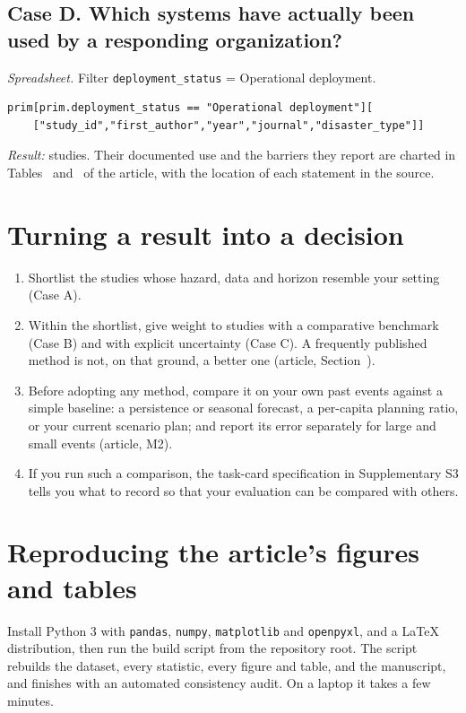 \documentclass[11pt,a4paper]{article}
\begin{document}
\subsection*{Case D. Which systems have actually been used by a responding organization?}
\emph{Spreadsheet.} Filter \texttt{deployment\_status} = Operational deployment.
\begin{Verbatim}
prim[prim.deployment_status == "Operational deployment"][
    ["study_id","first_author","year","journal","disaster_type"]]
\end{Verbatim}
\emph{Result:} \ucDoperational{} studies. Their documented use and the barriers they report are charted in Tables~\Xtabdeploymentcases{} and~\Xtabdeploymentbarriers{} of the article, with the location of each statement in the source.

\section{Turning a result into a decision}
\begin{enumerate}[leftmargin=*]
\item Shortlist the studies whose hazard, data and horizon resemble your setting (Case A).
\item Within the shortlist, give weight to studies with a comparative benchmark (Case B) and with explicit uncertainty (Case C). A frequently published method is not, on that ground, a better one (article, Section~\Xsecefficacy).
\item Before adopting any method, compare it on your own past events against a simple baseline: a persistence or seasonal forecast, a per-capita planning ratio, or your current scenario plan; and report its error separately for large and small events (article, M2).
\item If you run such a comparison, the task-card specification in Supplementary S3 tells you what to record so that your evaluation can be compared with others.
\end{enumerate}

\section{Reproducing the article's figures and tables}
Install Python 3 with \texttt{pandas}, \texttt{numpy}, \texttt{matplotlib} and \texttt{openpyxl}, and a \LaTeX{} distribution, then run the build script from the repository root. The script rebuilds the dataset, every statistic, every figure and table, and the manuscript, and finishes with an automated consistency audit. On a laptop it takes a few minutes.
\end{document}
